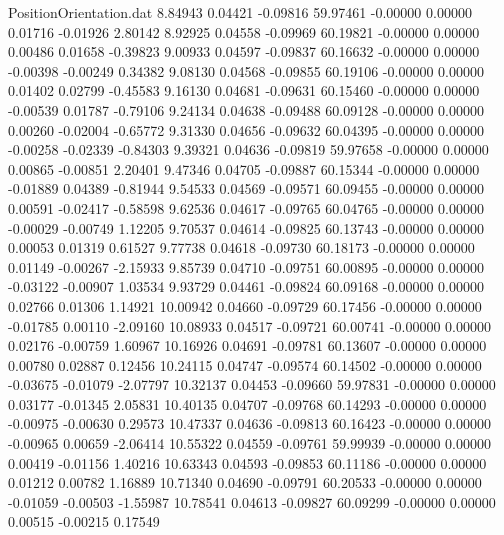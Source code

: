 \begin{filecontents}{PositionOrientation.dat}
   8.84943    0.04421   -0.09816    59.97461   -0.00000    0.00000    0.01716   -0.01926    2.80142
   8.92925    0.04558   -0.09969    60.19821   -0.00000    0.00000    0.00486    0.01658   -0.39823
   9.00933    0.04597   -0.09837    60.16632   -0.00000    0.00000   -0.00398   -0.00249    0.34382
   9.08130    0.04568   -0.09855    60.19106   -0.00000    0.00000    0.01402    0.02799   -0.45583
   9.16130    0.04681   -0.09631    60.15460   -0.00000    0.00000   -0.00539    0.01787   -0.79106
   9.24134    0.04638   -0.09488    60.09128   -0.00000    0.00000    0.00260   -0.02004   -0.65772
   9.31330    0.04656   -0.09632    60.04395   -0.00000    0.00000   -0.00258   -0.02339   -0.84303
   9.39321    0.04636   -0.09819    59.97658   -0.00000    0.00000    0.00865   -0.00851    2.20401
   9.47346    0.04705   -0.09887    60.15344   -0.00000    0.00000   -0.01889    0.04389   -0.81944
   9.54533    0.04569   -0.09571    60.09455   -0.00000    0.00000    0.00591   -0.02417   -0.58598
   9.62536    0.04617   -0.09765    60.04765   -0.00000    0.00000   -0.00029   -0.00749    1.12205
   9.70537    0.04614   -0.09825    60.13743   -0.00000    0.00000    0.00053    0.01319    0.61527
   9.77738    0.04618   -0.09730    60.18173   -0.00000    0.00000    0.01149   -0.00267   -2.15933
   9.85739    0.04710   -0.09751    60.00895   -0.00000    0.00000   -0.03122   -0.00907    1.03534
   9.93729    0.04461   -0.09824    60.09168   -0.00000    0.00000    0.02766    0.01306    1.14921
  10.00942    0.04660   -0.09729    60.17456   -0.00000    0.00000   -0.01785    0.00110   -2.09160
  10.08933    0.04517   -0.09721    60.00741   -0.00000    0.00000    0.02176   -0.00759    1.60967
  10.16926    0.04691   -0.09781    60.13607   -0.00000    0.00000    0.00780    0.02887    0.12456
  10.24115    0.04747   -0.09574    60.14502   -0.00000    0.00000   -0.03675   -0.01079   -2.07797
  10.32137    0.04453   -0.09660    59.97831   -0.00000    0.00000    0.03177   -0.01345    2.05831
  10.40135    0.04707   -0.09768    60.14293   -0.00000    0.00000   -0.00975   -0.00630    0.29573
  10.47337    0.04636   -0.09813    60.16423   -0.00000    0.00000   -0.00965    0.00659   -2.06414
  10.55322    0.04559   -0.09761    59.99939   -0.00000    0.00000    0.00419   -0.01156    1.40216
  10.63343    0.04593   -0.09853    60.11186   -0.00000    0.00000    0.01212    0.00782    1.16889
  10.71340    0.04690   -0.09791    60.20533   -0.00000    0.00000   -0.01059   -0.00503   -1.55987
  10.78541    0.04613   -0.09827    60.09299   -0.00000    0.00000    0.00515   -0.00215    0.17549

\end{filecontents}
